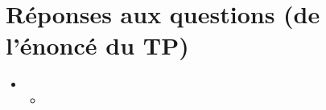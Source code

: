 %
\section{Réponses aux questions (de l'énoncé du TP)}
\begin{frame}{\secname}
%

\begin{itemize}
    \item 
    \vspace{0.3cm}

    \begin{itemize}
        \item  
    \end{itemize}
   
\end{itemize}

\end{frame}
